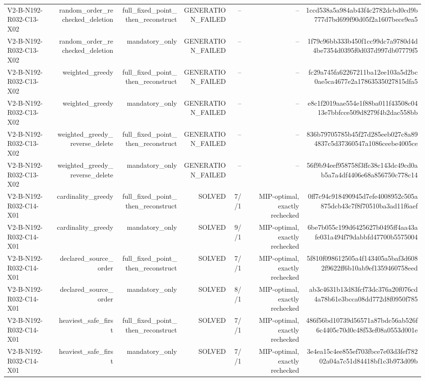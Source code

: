 {\begin{longtable}{lrrrrrr}
V2-B-N192-R032-C13-X02 & random\_order\_rechecked\_deletion & full\_fixed\_point\_then\_reconstruct & GENERATION\_FAILED & -- & -- & 1ccd538a5a984ab43f4c2782dcbd0cd9b777d7bd699f90d05f2a1607bece9ea5 \\
V2-B-N192-R032-C13-X02 & random\_order\_rechecked\_deletion & mandatory\_only & GENERATION\_FAILED & -- & -- & 1f79c96bb333b450f1cc99dc7a9780d4d4be7354d0395f0d037d997db07779f5 \\
V2-B-N192-R032-C13-X02 & weighted\_greedy & full\_fixed\_point\_then\_reconstruct & GENERATION\_FAILED & -- & -- & fc29a745fa62267211ba12ee103a5d2bc0ae5ca4677e2a17863535027815dfa5 \\
V2-B-N192-R032-C13-X02 & weighted\_greedy & mandatory\_only & GENERATION\_FAILED & -- & -- & e8c1f2019aae554e1f88ba011f43508c0413e7bbfcce509d8279f4b2dac558bb \\
V2-B-N192-R032-C13-X02 & weighted\_greedy\_reverse\_delete & full\_fixed\_point\_then\_reconstruct & GENERATION\_FAILED & -- & -- & 836b79705785b45f27d285eeb027c8a894837c5d37360547a1086ceebe4005ce \\
V2-B-N192-R032-C13-X02 & weighted\_greedy\_reverse\_delete & mandatory\_only & GENERATION\_FAILED & -- & -- & 56f9b94eef958758f3ffc38c143dc49cd0ab5a7a4df4406e68a856750c778c14 \\
V2-B-N192-R032-C14-X01 & cardinality\_greedy & full\_fixed\_point\_then\_reconstruct & SOLVED & 7//1 & MIP-optimal, exactly rechecked & 0ff7c94c918490945d7efe4008952c505a875dcb43c7f8f70510ba3ad11f6aef \\
V2-B-N192-R032-C14-X01 & cardinality\_greedy & mandatory\_only & SOLVED & 9//1 & MIP-optimal, exactly rechecked & 6be7b055c199d6425627b0495ff4aa43afe031a494f79dabbfd47700b5575004 \\
V2-B-N192-R032-C14-X01 & declared\_source\_order & full\_fixed\_point\_then\_reconstruct & SOLVED & 7//1 & MIP-optimal, exactly rechecked & 5f810f098612505a4f143405a5baf3d6082f9622ff6b10ab9ef1359460758eed \\
V2-B-N192-R032-C14-X01 & declared\_source\_order & mandatory\_only & SOLVED & 8//1 & MIP-optimal, exactly rechecked & ab3c4631b13d83fcf73dc376a20f076cd4a78b61e3bcca08dd772d8f0950f785 \\
V2-B-N192-R032-C14-X01 & heaviest\_safe\_first & full\_fixed\_point\_then\_reconstruct & SOLVED & 7//1 & MIP-optimal, exactly rechecked & 486f56bd10739d56571a87bdc56ab526f6c4405c70d0c48f53ef08a0553d001e \\
V2-B-N192-R032-C14-X01 & heaviest\_safe\_first & mandatory\_only & SOLVED & 7//1 & MIP-optimal, exactly rechecked & 3e4ea15c4ee855ef703fbce7e03d3fef78202a04a7c51d84418bf1c3b973d09b \\

\end{longtable}}

